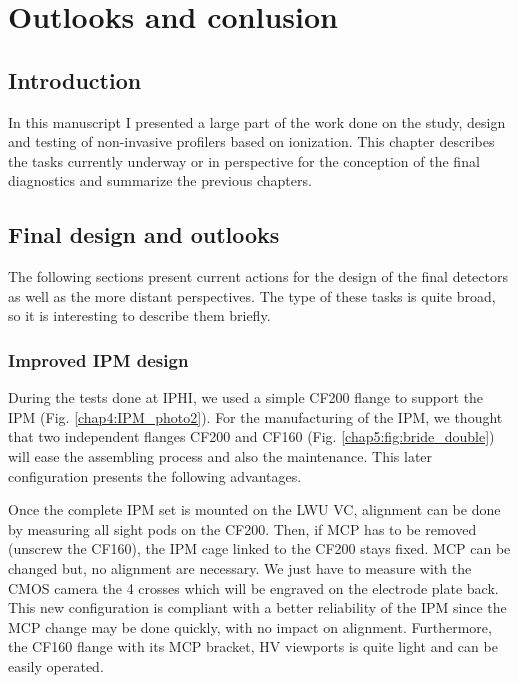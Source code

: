 \chapter{Outlooks and conlusion}
\cleardoublepage

\minitoc
\section{Introduction}
\begin{refsection}
  In this manuscript I presented a large part of the work done on the study, design and testing of non-invasive profilers based on ionization. This chapter describes the tasks currently underway or in perspective for the conception of the final diagnostics and summarize the previous chapters. 

  \section{Final design and outlooks}
  The following sections present current actions for the design of the final detectors as well as the more distant perspectives. The type of these tasks is quite broad, so it is interesting to describe them briefly.

  \subsection{Improved IPM design}
  During the tests done at IPHI, we used a simple CF200 flange to support the IPM (Fig. \ref{chap4:IPM_photo2}). For the manufacturing of the IPM, we thought that two independent flanges CF200 and CF160 (Fig. \ref{chap5:fig:bride_double}) will ease the assembling process and also the maintenance. This later configuration presents the following advantages.

  

  Once the complete IPM set is mounted on the LWU VC, alignment can be done by measuring all sight pods on the CF200. Then, if MCP has to be removed (unscrew the CF160), the IPM cage linked to the CF200 stays fixed. MCP can be changed but, no alignment are necessary. We just have to measure with the CMOS camera the 4 crosses which will be engraved on the electrode plate back. This new configuration is compliant with a better reliability of the IPM since the MCP change may be done quickly, with no impact on alignment. Furthermore, the CF160 flange with its MCP bracket, HV viewports is quite light and can be easily operated.


\end{refsection}

